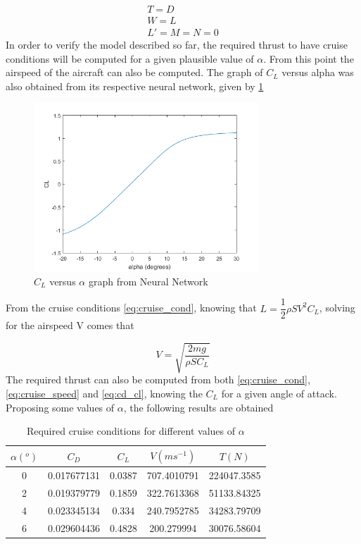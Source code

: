 \begin{gather}
	T=D\\
	W=L\\
	L'=M=N=0
\label{eq:cruise_cond}
\end{gather}
In order to verify the model described so far, the required thrust to have cruise conditions will be computed for a given plausible value of $\alpha$. From this point the airspeed of the aircraft can also be computed. The graph of $C_L$ versus alpha was also obtained from its respective neural network, given by \ref{fig:cl_alpha}
\begin{figure}[!htb]
  \centering
  \includegraphics[width=0.75\textwidth]{Figures/CL_alpha.png}
  \caption[$C_L$ versus $\alpha$ graph]{$C_L$ versus $\alpha$ graph from Neural Network}
  \label{fig:cl_alpha}
\end{figure}
From the cruise conditions \ref{eq:cruise_cond}, knowing that $L=\dfrac{1}{2}\rho S V^2 C_L$, solving for the airspeed V comes that

\begin{equation}
V=\sqrt{\dfrac{2mg}{\rho S C_L}}
\label{eq:cruise_speed}
\end{equation}
The required thrust can also be computed from both \ref{eq:cruise_cond}, \ref{eq:cruise_speed} and \ref{eq:cd_cl}, knowing the $C_L$ for a given angle of attack. Proposing some values of $\alpha$, the following results are obtained

\begin{table}[htbp]
  \centering
  \caption{Required cruise conditions for different values of $\alpha$}
    \begin{tabular}{ccccc}
    \toprule
    $\alpha (^o)$ & $C_D$ & $C_L$ & $V (ms^{-1})$ & $T (N)$ \\
    \midrule
    0     & 0.017677131 & 0.0387 & 707.4010791 & 224047.3585 \\
    2     & 0.019379779 & 0.1859 & 322.7613368 & 51133.84325 \\
    4     & 0.023345134 & 0.334 & 240.7952785 & 34283.79709 \\
    6     & 0.029604436 & 0.4828 & 200.279994 & 30076.58604 \\
    \bottomrule

    \end{tabular}
  \label{tab:cruise_cond}%
\end{table}%

